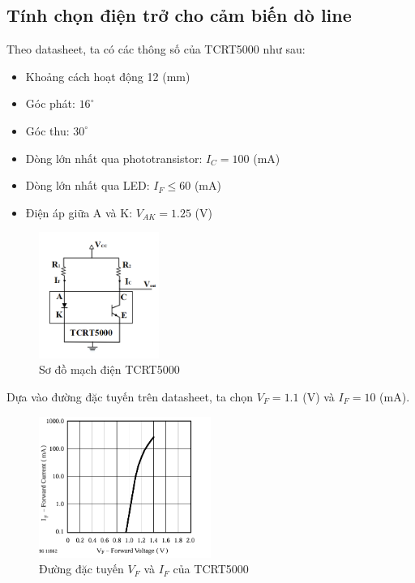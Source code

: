         \subsection{Tính chọn điện trở cho cảm biến dò line}
            \hspace*{0.6cm}Theo datasheet, ta có các thông số của TCRT5000 như sau:
            \begin{itemize}
                \item Khoảng cách hoạt động 12 (mm)
                \item Góc phát: $ 16^{\circ}$
                \item Góc thu: $ 30^{\circ}$
                \item Dòng lớn nhất qua phototransistor: $ I_{C} = 100$ (mA)
                \item Dòng lớn nhất qua LED: $I_{F} \leq 60$ (mA)
                \item Điện áp giữa A và K: $V_{AK} = 1.25$ (V)
            \end{itemize}
            \begin{figure}[H]
                \centering
                \includegraphics[width=0.35\textwidth]{pictures/chapter4/c4_p2_TCRT5000Schematic.png}
                \caption{Sơ đồ mạch điện TCRT5000}
                \label{fig:4-2}
            \end{figure}
            \hspace*{0.6cm}Dựa vào đường đặc tuyến trên datasheet, ta chọn $V_{F} = 1.1$ (V) và $I_{F} = 10$ (mA).\\
            \begin{figure}[H]
                \centering
                \includegraphics[width=0.5\textwidth]{pictures/chapter4/c4_p3_Voltage&Current.png}
                \caption{Đường đặc tuyến $V_{F}$ và $I_{F}$ của TCRT5000}
                \label{fig:4-3}
            \end{figure}

